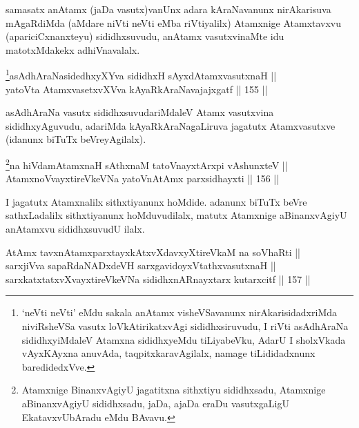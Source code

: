 \begin{artha}
samasatx anAtamx (jaDa vasutx)vanUnx adara kAraNavanunx nirAkarisuva
mAgaRdiMda (aMdare niVti neVti eMba riVtiyalilx) Atamxnige Atamxtavxvu
(apariciCxnanxteyu) sididhxsuvudu, anAtamx vasutxvinaMte idu
matotxMdakekx adhiVnavalalx.
\end{artha}



\begin{shl}
\footnote{`neVti neVti' eMdu sakala anAtamx visheVSavanunx nirAkarisidadxriMda niviRsheVSa vasutx loVkAtirikatxvAgi sididhxsiruvudu, I riVti asAdhAraNa sididhxyiMdaleV Atamxna sididhxyeMdu tiLiyabeVku, AdarU I sholxVkada vAyxKAyxna anuvAda, taqpitxkaravAgilalx, namage tiLididadxnunx baredidedxVve.}asAdhAraNasidedhxyXYva sididhxH sAyxdAtamxvasutxnaH || \\
yatoV\s ta AtamxvasetxvXVva kAyaRkAraNavajajxgatf \hfill || 155 ||  
\end{shl}

\begin{artha}
asAdhAraNa vasutx sididhxsuvudariMdaleV Atamx vasutxvina
sididhxyAguvudu, adariMda kAyaRkAraNagaLiruva jagatutx Atamxvasutxve
(idanunx biTuTx beVreyAgilalx).
\end{artha}


\begin{shl}
\footnote{Atamxnige BinanxvAgiyU jagatitxna sithxtiyu sididhxsadu, Atamxnige aBinanxvAgiyU sididhxsadu, jaDa, ajaDa eraDu vasutxgaLigU EkatavxvUbAradu eMdu BAvavu.}na hiVdamAtamxnaH sAthxnaM tatoV\s nayxtArxpi vA\s shunxteV || \\
AtamxnoV\s vayxtireVkeVNa yatoV\s nAtAmx parxsidhayxti \hfill || 156 ||  
\end{shl}

\begin{artha}
I jagatutx Atamxnalilx sithxtiyanunx hoMdide. adanunx biTuTx beVre
sathxLadalilx sithxtiyanunx hoMduvudilalx, matutx Atamxnige
aBinanxvAgiyU anAtamxvu sididhxsuvudU ilalx.
\end{artha}


\begin{shl}
AtAmx tavxnAtamxparxtayxkAtxvXdavxyXtireVkaM na soV\s haRti || \\
sarxjiVva sapaRdaNADxdeVH sarxgavidoyxVtathxvasutxnaH || \\
sarxkatxtatxvXvayxtireVkeVNa sididhxnARnayxtarx kutarxcitf \hfill || 157 ||  
\end{shl}

